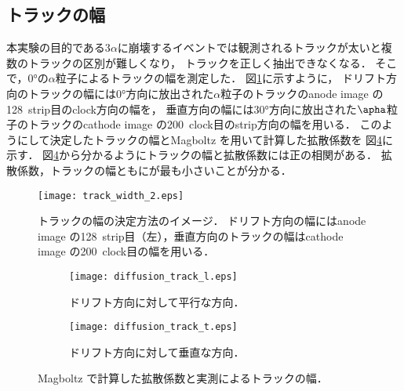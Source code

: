 \documentclass[../master]{subfiles}
\begin{document}
\subsection{トラックの幅}
本実験の目的である3$\alpha$に崩壊するイベントでは観測されるトラックが太いと複数のトラックの区別が難しくなり，
トラックを正しく抽出できなくなる．
そこで，\ang{0}の$\alpha$粒子によるトラックの幅を測定した．
図\ref{fig::track_width}に示すように，
ドリフト方向のトラックの幅には\ang{0}方向に放出された$\alpha$粒子のトラックのanode image の128~strip目のclock方向の幅を，
垂直方向の幅には\ang{30}方向に放出された$\apha$粒子のトラックのcathode image の200~clock目のstrip方向の幅を用いる．
このようにして決定したトラックの幅とMagboltz を用いて計算した拡散係数を%
図\ref{fig::diffusion_compare}に示す．
図\ref{fig::diffusion_compare}から分かるようにトラックの幅と拡散係数には正の相関がある．
拡散係数，トラックの幅ともに\isoButaneHydro が最も小さいことが分かる．
\begin{figure}
  \centering
  \texttt{[image: track\_width\_2.eps]}
  \caption{トラックの幅の決定方法のイメージ．
    ドリフト方向の幅にはanode image の128~strip目（左），垂直方向のトラックの幅はcathode image の200~clock目の幅を用いる．}
  \label{fig::track_width}
\end{figure}

\begin{figure}
  \centering
  \begin{subfigure}{0.45\columnwidth}
    \centering
    \texttt{[image: diffusion\_track\_l.eps]}
    \caption{ドリフト方向に対して平行な方向．}
    \label{fig::diffusion_compare_l}
  \end{subfigure}
  \begin{subfigure}{0.45\columnwidth}
    \centering
    \texttt{[image: diffusion\_track\_t.eps]}
    \caption{ドリフト方向に対して垂直な方向．}
    \label{fig::diffusion_compare_t}
  \end{subfigure}
  \caption{Magboltz で計算した拡散係数と実測によるトラックの幅．}
  \label{fig::diffusion_compare}
\end{figure}
\end{document}
